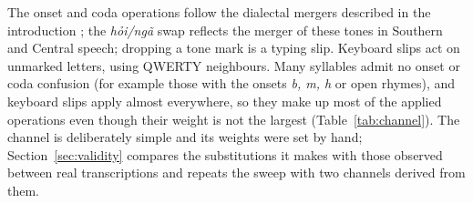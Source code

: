 \documentclass[11pt]{article}
\newcommand{\vi}[1]{\textit{#1}}          %
\begin{document}
The onset and coda operations follow the dialectal mergers described in the introduction
\citep{hoang2004phuongngu,kirby2011hanoi}; the \vi{hỏi/ngã} swap reflects the merger of these tones in
Southern and Central speech; dropping a tone mark is a typing slip. Keyboard slips act on unmarked letters,
using QWERTY neighbours. Many syllables admit no onset or coda confusion (for example those with the onsets
\vi{b, m, h} or open rhymes), and keyboard slips apply almost everywhere, so they make up most of the applied
operations even though their weight is not the largest (Table~\ref{tab:channel}). The channel is
deliberately simple and its weights were set by hand; Section~\ref{sec:validity} compares the substitutions it
makes with those observed between real transcriptions and repeats the sweep with two channels derived from
them.
\end{document}
